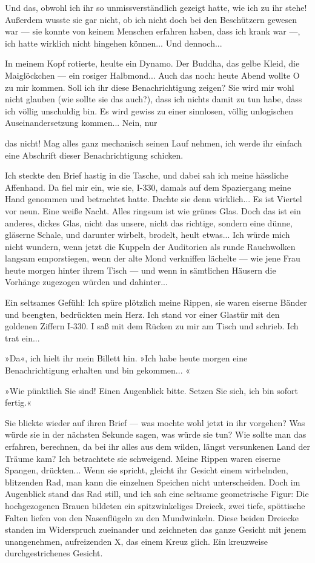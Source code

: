 Und das, obwohl ich ihr so unmissverständlich gezeigt hatte, wie
ich zu ihr stehe! Außerdem wusste sie gar nicht, ob ich nicht doch
bei den Beschützern gewesen war — sie konnte von keinem Menschen
erfahren haben, dass ich krank war —, ich hatte wirklich nicht
hingehen können... Und dennoch...

In meinem Kopf rotierte, heulte ein Dynamo. Der Buddha, das gelbe
Kleid, die Maiglöckchen — ein rosiger Halbmond... Auch das noch:
heute Abend wollte O zu mir kommen. Soll ich ihr diese
Benachrichtigung zeigen? Sie wird mir wohl nicht glauben (wie
sollte sie das auch?), dass ich nichts damit zu tun habe, dass ich
völlig unschuldig bin. Es wird gewiss zu einer sinnlosen, völlig
unlogischen Auseinandersetzung kommen... Nein, nur

das nicht! Mag alles ganz mechanisch seinen Lauf nehmen, ich werde
ihr einfach eine Abschrift dieser Benachrichtigung schicken.

Ich steckte den Brief hastig in die Tasche, und dabei sah ich meine
hässliche Affenhand. Da fiel mir ein, wie sie, I-330, damals auf
dem Spaziergang meine Hand genommen und betrachtet hatte. Dachte
sie denn wirklich... Es ist Viertel vor neun. Eine weiße Nacht.
Alles ringsum ist wie grünes Glas. Doch das ist ein anderes, dickes
Glas, nicht das unsere, nicht das richtige, sondern eine dünne,
gläserne Schale, und darunter wirbelt, brodelt, heult etwas... Ich
würde mich nicht wundern, wenn jetzt die Kuppeln der Auditorien als
runde Rauchwolken langsam emporstiegen, wenn der alte Mond
verkniffen lächelte — wie jene Frau heute morgen hinter ihrem Tisch
— und wenn in sämtlichen Häusern die Vorhänge zugezogen würden und
dahinter...

Ein seltsames Gefühl: Ich spüre plötzlich meine Rippen, sie waren
eiserne Bänder und beengten, bedrückten mein Herz. Ich stand vor
einer Glastür mit den goldenen Ziffern I-330. I saß mit dem Rücken
zu mir am Tisch und schrieb. Ich trat ein...

»Da«, ich hielt ihr mein Billett hin. »Ich habe heute morgen eine
Benachrichtigung erhalten und bin gekommen... «

»Wie pünktlich Sie sind! Einen Augenblick bitte. Setzen Sie sich,
ich bin sofort fertig.«

Sie blickte wieder auf ihren Brief — was mochte wohl jetzt in ihr
vorgehen? Was würde sie in der nächsten Sekunde sagen, was würde
sie tun? Wie sollte man das erfahren, berechnen, da bei ihr alles
aus dem wilden, längst versunkenen Land der Träume kam? Ich
betrachtete sie schweigend. Meine Rippen waren eiserne Spangen,
drückten... Wenn sie spricht, gleicht ihr Gesicht einem wirbelnden,
blitzenden Rad, man kann die einzelnen Speichen nicht
unterscheiden. Doch im Augenblick stand das Rad still, und ich sah
eine seltsame geometrische Figur: Die hochgezogenen Brauen bildeten
ein spitzwinkeliges Dreieck, zwei tiefe, spöttische Falten liefen
von den Nasenflügeln zu den Mundwinkeln. Diese beiden Dreiecke
standen im Widerspruch zueinander und zeichneten das ganze Gesicht
mit jenem unangenehmen, aufreizenden X, das einem Kreuz glich. Ein
kreuzweise durchgestrichenes Gesicht.

